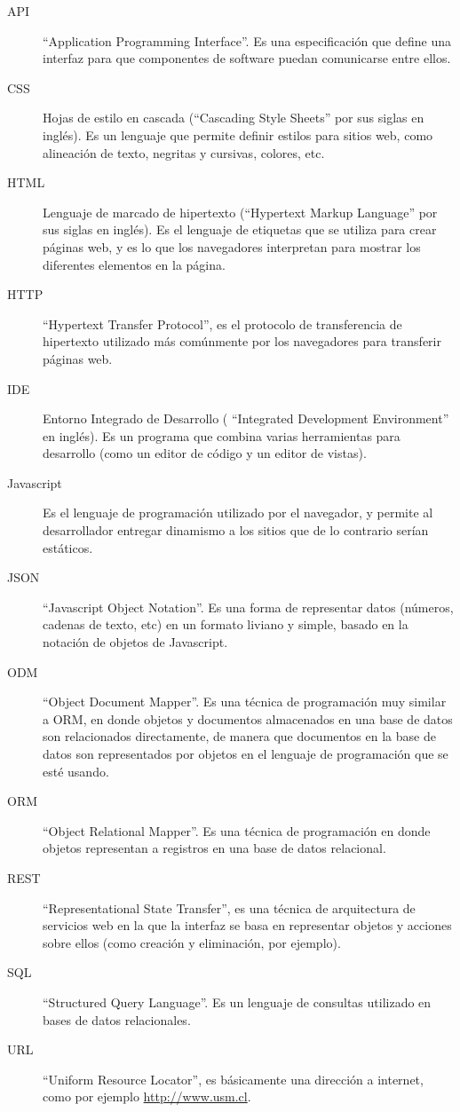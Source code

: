\documentclass[12pt,spanish,letter]{report}
\begin{document}
\begin{description}
	\item[API] ``Application Programming Interface''. Es una especificación que define una interfaz para que componentes de software puedan comunicarse entre ellos.
	\item[CSS] Hojas de estilo en cascada (``Cascading Style Sheets'' por sus siglas en inglés). Es un lenguaje que permite definir estilos para sitios web, como alineación de texto, negritas y cursivas, colores, etc.
	\item[HTML] Lenguaje de marcado de hipertexto (``Hypertext Markup Language'' por sus siglas en inglés). Es el lenguaje de etiquetas que se utiliza para crear páginas web, y es lo que los navegadores interpretan para mostrar los diferentes elementos en la página.
	\item[HTTP] ``Hypertext Transfer Protocol'', es el protocolo de transferencia de hipertexto utilizado más comúnmente por los navegadores para transferir páginas web.
	\item[IDE] Entorno Integrado de Desarrollo ( ``Integrated Development Environment'' en inglés). Es un programa que combina varias herramientas para desarrollo (como un editor de código y un editor de vistas).
	\item[Javascript] Es el lenguaje de programación utilizado por el navegador, y permite al desarrollador entregar dinamismo a los sitios que de lo contrario serían estáticos.
	\item[JSON] ``Javascript Object Notation''. Es una forma de representar datos (números, cadenas de texto, etc) en un formato liviano y simple, basado en la notación de objetos de Javascript.
	\item[ODM] ``Object Document Mapper''. Es una técnica de programación muy similar a ORM, en donde objetos y documentos almacenados en una base de datos son relacionados directamente, de manera que documentos en la base de datos son representados por objetos en el lenguaje de programación que se esté usando.
	\item[ORM] ``Object Relational Mapper''. Es una técnica de programación en donde objetos representan a registros en una base de datos relacional.
	\item[REST] ``Representational State Transfer'', es una técnica de arquitectura de servicios web en la que la interfaz se basa en representar objetos y acciones sobre ellos (como creación y eliminación, por ejemplo).
	\item[SQL] ``Structured Query Language''. Es un lenguaje de consultas utilizado en bases de datos relacionales.	
	\item[URL] ``Uniform Resource Locator'', es básicamente una dirección a internet, como por ejemplo \href{http://www.usm.cl}{http://www.usm.cl}.
\end{description}
\end{document}
